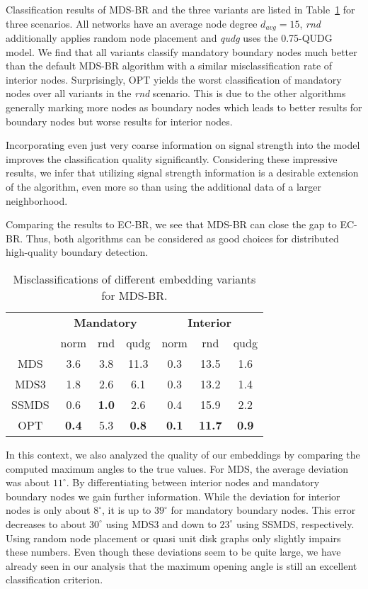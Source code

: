 \documentclass{llncs}
\begin{document}
Classification results of MDS-BR and the three variants are listed in Table~\ref{tab:mdsbr_ss} for three scenarios.
All networks have an average node degree $d_{avg}=15$, \emph{rnd} additionally applies random node placement and \emph{qudg} uses the 0.75-QUDG model.
We find that all variants classify mandatory boundary nodes much better than the default MDS-BR algorithm with a similar misclassification rate of interior nodes.
Surprisingly, OPT yields the worst classification of mandatory nodes over all variants in the \emph{rnd} scenario.
This is due to the other algorithms generally marking more nodes as boundary nodes which leads to better results for boundary nodes but worse results for interior nodes.

Incorporating even just very coarse information on signal strength into the model improves the classification quality significantly.
Considering these impressive results, we infer that utilizing signal strength information is a desirable extension of the algorithm, even more so than using the additional data of a larger neighborhood.

Comparing the results to EC-BR, we see that MDS-BR can close the gap to EC-BR.
Thus, both algorithms can be considered as good choices for distributed high-quality boundary detection.

\begin{table}[b]
\setlength\tabcolsep{5pt}
\centering
\caption{Misclassifications of different embedding variants for MDS-BR.}\label{tab:mdsbr_ss}
\begin{tabular}{c||ccc||ccc}
& \multicolumn{3}{c||}{\bfseries Mandatory}& \multicolumn{3}{c}{\bfseries Interior} \\
 & norm & rnd & qudg & norm & rnd & qudg \\
\hline
MDS & 3.6 & 3.8 & 11.3 & 0.3 & 13.5 & 1.6  \\
MDS3 & 1.8 & 2.6 & 6.1 & 0.3 & 13.2 & 1.4  \\
SSMDS & 0.6 & \bfseries 1.0 & 2.6 & 0.4 & 15.9 & 2.2  \\
OPT & \bfseries 0.4 & 5.3 & \bfseries 0.8 & \bfseries 0.1 & \bfseries 11.7 & \bfseries 0.9
\end{tabular}
\end{table}

In this context, we also analyzed the quality of our embeddings by comparing the computed maximum angles to the true values.
For MDS, the average deviation was about $11^\circ$.
By differentiating between interior nodes and mandatory boundary nodes we gain further information.
While the deviation for interior nodes is only about $8^\circ$, it is up to $39^\circ$ for mandatory boundary nodes.
This error decreases to about $30^\circ$ using MDS3 and down to $23^\circ$ using SSMDS, respectively.
Using random node placement or quasi unit disk graphs only slightly impairs these numbers.
Even though these deviations seem to be quite large, we have already seen in our analysis that the maximum opening angle is still an excellent classification criterion.
\end{document}
